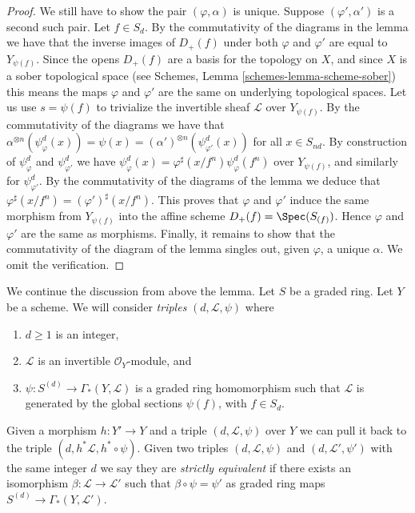 \begin{proof}
\medskip\noindent
We still have to show the pair $(\varphi, \alpha)$ is unique.
Suppose $(\varphi', \alpha')$ is a second such pair.
Let $f \in S_d$. By the commutativity of the diagrams in the lemma we have
that the inverse images of $D_{+}(f)$ under both $\varphi$ and $\varphi'$
are equal to $Y_{\psi(f)}$. Since the opens $D_{+}(f)$ are a basis
for the topology on $X$, and since $X$ is a sober topological
space (see Schemes, Lemma \ref{schemes-lemma-scheme-sober})
this means the maps $\varphi$ and $\varphi'$ are the same
on underlying topological spaces. Let us use $s = \psi(f)$ to
trivialize the invertible sheaf $\mathcal{L}$ over $Y_{\psi(f)}$.
By the commutativity of the diagrams we have that
$\alpha^{\otimes n}(\psi^d_{\varphi}(x)) =
\psi(x) = (\alpha')^{\otimes n}(\psi^d_{\varphi'}(x))$
for all $x \in S_{nd}$. By construction of $\psi^d_{\varphi}$
and $\psi^d_{\varphi'}$ we have
$\psi^d_{\varphi}(x) = \varphi^\sharp(x/f^n) \psi^d_{\varphi}(f^n)$
over $Y_{\psi(f)}$,
and similarly for $\psi^d_{\varphi'}$. By the commutativity of
the diagrams of the lemma we deduce that
$\varphi^\sharp(x/f^n) = (\varphi')^\sharp(x/f^n)$.
This proves that $\varphi$ and $\varphi'$ induce the same morphism
from $Y_{\psi(f)}$ into the affine scheme $D_{+}(f) = \Spec(S_{(f)})$.
Hence $\varphi$ and $\varphi'$ are the same as morphisms.
Finally, it remains to show that the commutativity of the
diagram of the lemma singles out, given $\varphi$, a unique
$\alpha$. We omit the verification.
\end{proof}

\noindent
We continue the discussion from above the lemma.
Let $S$ be a graded ring.
Let $Y$ be a scheme. We will consider {\it triples}
$(d, \mathcal{L}, \psi)$ where
\begin{enumerate}
\item $d \geq 1$ is an integer,
\item $\mathcal{L}$ is an invertible $\mathcal{O}_Y$-module, and
\item $\psi : S^{(d)} \to \Gamma_*(Y, \mathcal{L})$ is a graded
ring homomorphism such that $\mathcal{L}$ is generated by
the global sections $\psi(f)$, with $f \in S_d$.
\end{enumerate}
Given a morphism $h : Y' \to Y$ and a triple
$(d, \mathcal{L}, \psi)$ over $Y$ we can pull it back to the
triple $(d, h^*\mathcal{L}, h^* \circ \psi)$.
Given two triples $(d, \mathcal{L}, \psi)$ and
$(d, \mathcal{L}', \psi')$ with the same integer $d$
we say they are {\it strictly equivalent} if there exists
an isomorphism $\beta : \mathcal{L} \to \mathcal{L}'$
such that $\beta \circ \psi = \psi'$ as graded
ring maps $S^{(d)} \to \Gamma_*(Y, \mathcal{L}')$.

